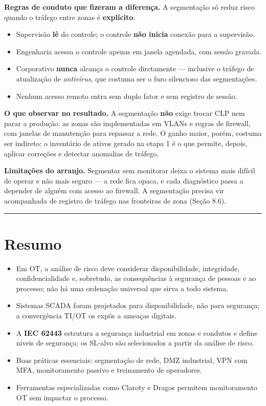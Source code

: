 \textbf{Regras de conduto que fizeram a diferença.} A segmentação só reduz risco quando o tráfego entre
zonas é \textbf{explícito}:

\begin{itemize}
\tightlist
\item
  Supervisão \textbf{lê} do controle; o controle \textbf{não inicia} conexão para a supervisão.
\item
  Engenharia acessa o controle apenas em janela agendada, com sessão gravada.
\item
  Corporativo \textbf{nunca} alcança o controle diretamente --- inclusive o tráfego de atualização de
  \emph{antivírus}, que costuma ser o furo silencioso das segmentações.
\item
  Nenhum acesso remoto entra sem duplo fator e sem registro de sessão.
\end{itemize}

\textbf{O que observar no resultado.} A segmentação \textbf{não} exige trocar CLP nem parar a produção: as
zonas são implementadas em VLANs e regras de firewall, com janelas de manutenção para repassar a
rede. O ganho maior, porém, costuma ser indireto: o inventário de ativos gerado na etapa 1 é o que
permite, depois, aplicar correções e detectar anomalias de tráfego.

\textbf{Limitações do arranjo.} Segmentar sem monitorar deixa o sistema mais difícil de operar e não
mais seguro --- a rede fica opaca, e cada diagnóstico passa a depender de alguém com acesso ao
firewall. A segmentação precisa vir acompanhada de registro de tráfego nas fronteiras de zona
(Seção 8.6).

\begin{center}\rule{0.5\linewidth}{0.5pt}\end{center}

\section{Resumo}\label{resumo}

\begin{itemize}
\tightlist
\item
  Em OT, a análise de risco deve considerar disponibilidade, integridade, confidencialidade e, sobretudo, as consequências à segurança de pessoas e ao processo; não há uma ordenação universal que sirva a todo sistema.
\item
  Sistemas SCADA foram projetados para disponibilidade, não para segurança; a convergência TI/OT os expôs a ameaças digitais.
\item
  A \textbf{IEC 62443} estrutura a segurança industrial em zonas e condutos e define níveis de segurança; os SL-alvo são selecionados a partir da análise de risco.
\item
  Boas práticas essenciais: segmentação de rede, DMZ industrial, VPN com MFA, monitoramento passivo e treinamento de operadores.
\item
  Ferramentas especializadas como Claroty e Dragos permitem monitoramento OT sem impactar o processo.
\end{itemize}

